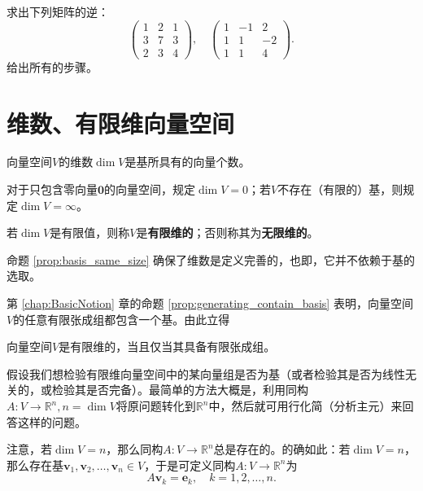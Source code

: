 \begin{problemset}
  \item 求出下列矩阵的逆：
  \[\left(\begin{array}{ccc}1&2&1\\3&7&3\\2&3&4\end{array}\right),\quad\left(\begin{array}{ccc}1&-1&2\\1&1&-2\\1&1&4\end{array}\right).\]
  给出所有的步骤。
\end{problemset}

\section{维数、有限维向量空间}\label{sec:finite_dimensional_space}

\begin{definition*}
  向量空间$V$的维数$\dim V$是基所具有的向量个数。

  对于只包含零向量$\mathbf{0}$的向量空间，规定$\dim V=0$；若$V$不存在（有限的）基，则规定$\dim V=\infty$。

  若$\dim V$是有限值，则称$V$是{\bf 有限维的}；否则称其为{\bf 无限维的}。
\end{definition*}

命题 \ref{prop:basis_same_size} 确保了维数是定义完善的，也即，它并不依赖于基的选取。

第 \ref{chap:BasicNotion} 章的命题 \ref{prop:generating_contain_basis} 表明，向量空间$V$的任意有限张成组都包含一个基。由此立得
\begin{proposition}
  向量空间$V$是有限维的，当且仅当其具备有限张成组。
\end{proposition}

假设我们想检验有限维向量空间中的某向量组是否为基（或者检验其是否为线性无关的，或检验其是否完备）。最简单的方法大概是，利用同构$A:V\to \mathbb{R}^n,n=\dim V$将原问题转化到$\mathbb{R}^n$中，然后就可用行化简（分析主元）来回答这样的问题。

注意，若$\dim V=n$，那么同构$A:V\to \mathbb{R}^n$总是存在的。的确如此：若$\dim V=n$，那么存在基$\mathbf{v}_{1},\mathbf{v}_{2},\ldots,\mathbf{v}_{n}\in V$，于是可定义同构$A:V\to \mathbb{R}^n$为
\[A\mathbf{v}_k=\mathbf{e}_k,\quad k=1,2,\ldots,n.\]

